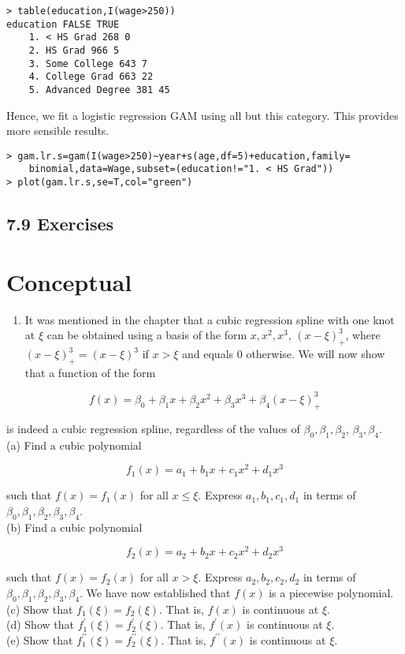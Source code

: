 \documentclass[10pt]{article}
\begin{document}
\begin{verbatim}
> table(education,I(wage>250))
education FALSE TRUE
    1. < HS Grad 268 0
    2. HS Grad 966 5
    3. Some College 643 7
    4. College Grad 663 22
    5. Advanced Degree 381 45
\end{verbatim}

Hence, we fit a logistic regression GAM using all but this category. This provides more sensible results.

\begin{verbatim}
> gam.lr.s=gam(I(wage>250)~year+s(age,df=5)+education,family=
    binomial,data=Wage,subset=(education!="1. < HS Grad"))
> plot(gam.lr.s,se=T,col="green")
\end{verbatim}

\subsection*{7.9 Exercises}
\section*{Conceptual}
\begin{enumerate}
  \item It was mentioned in the chapter that a cubic regression spline with one knot at $\xi$ can be obtained using a basis of the form $x, x^{2}, x^{3}$, $(x-\xi)_{+}^{3}$, where $(x-\xi)_{+}^{3}=(x-\xi)^{3}$ if $x>\xi$ and equals 0 otherwise. We will now show that a function of the form
\end{enumerate}

$$
f(x)=\beta_{0}+\beta_{1} x+\beta_{2} x^{2}+\beta_{3} x^{3}+\beta_{4}(x-\xi)_{+}^{3}
$$

is indeed a cubic regression spline, regardless of the values of $\beta_{0}, \beta_{1}, \beta_{2}$, $\beta_{3}, \beta_{4}$.\\
(a) Find a cubic polynomial

$$
f_{1}(x)=a_{1}+b_{1} x+c_{1} x^{2}+d_{1} x^{3}
$$

such that $f(x)=f_{1}(x)$ for all $x \leq \xi$. Express $a_{1}, b_{1}, c_{1}, d_{1}$ in terms of $\beta_{0}, \beta_{1}, \beta_{2}, \beta_{3}, \beta_{4}$.\\
(b) Find a cubic polynomial

$$
f_{2}(x)=a_{2}+b_{2} x+c_{2} x^{2}+d_{2} x^{3}
$$

such that $f(x)=f_{2}(x)$ for all $x>\xi$. Express $a_{2}, b_{2}, c_{2}, d_{2}$ in terms of $\beta_{0}, \beta_{1}, \beta_{2}, \beta_{3}, \beta_{4}$. We have now established that $f(x)$ is a piecewise polynomial.\\
(c) Show that $f_{1}(\xi)=f_{2}(\xi)$. That is, $f(x)$ is continuous at $\xi$.\\
(d) Show that $f_{1}^{\prime}(\xi)=f_{2}^{\prime}(\xi)$. That is, $f^{\prime}(x)$ is continuous at $\xi$.\\
(e) Show that $f_{1}^{\prime \prime}(\xi)=f_{2}^{\prime \prime}(\xi)$. That is, $f^{\prime \prime}(x)$ is continuous at $\xi$.
\end{document}
